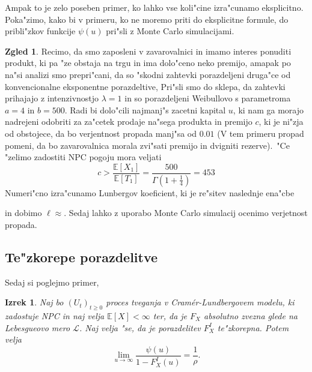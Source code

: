 \documentclass[12pt, a4paper, reqno]{amsart}
\theoremstyle{definition}
\newtheorem{zgled}[definicija]{Zgled}
\theoremstyle{plain}
\newtheorem{izrek}[definicija]{Izrek}
\newcommand{\E}{\mathbb{E}}
\newcommand{\1}{\mathds{1}}
\begin{document}
                Ampak to je zelo poseben primer, ko lahko vse koli"cine izra"cunamo eksplicitno.
                Poka"zimo, kako bi v primeru, ko ne moremo priti do eksplicitne formule,
                 do pribli"zkov funkcije $\psi(u)$ pri"sli z Monte Carlo simulacijami.
            
            \begin{zgled}
                Recimo, da smo zaposleni v zavarovalnici in imamo interes ponuditi produkt, ki 
                pa "ze obstaja na trgu in ima dolo"ceno neko premijo, amapak po na"si analizi smo 
                prepri"cani, da so "skodni
                zahtevki porazdeljeni druga"ce od konvencionalne eksponentne porazdeltive, Pri"sli smo 
                do sklepa, da zahtevki prihajajo z intenzivnostjo
                $\lambda = 1$ in so porazdeljeni Weibullovo s parametroma $a = 4$ in $b = 500$. 
                Radi bi dolo"cili najmanj"s zacetni kapital $u$, ki nam ga morajo nadrejeni
                odobriti za za"cetek prodaje 
                na"sega produkta in premijo $c$, ki je ni"zja od obstojece, da bo verjentnost 
                propada manj"sa od $0.01$ (V tem primeru propad pomeni, da bo zavarovalnica morala 
                zvi"sati premijo in dvigniti rezerve).\ "Ce "zelimo zadostiti NPC pogoju mora veljati 
                \begin{equation*}
                    c > \frac{\E\left[X_1\right]}{\E\left[T_1\right]} =  \frac{500}{\Gamma(1 + \tfrac{1}{4})} = 453
                \end{equation*} 
                Numeri"cno izra"cunamo Lunbergov koeficient, ki je re"sitev 
                naslednje ena"cbe
                
                in dobimo $\ell \approx .$
                Sedaj lahko z uporabo Monte Carlo simulacij ocenimo verjetnost propada.
                
            \end{zgled}


        
    \subsection{Te"zkorepe porazdelitve}
        Sedaj si poglejmo primer, 
        \begin{izrek}
            Naj bo $(U_t)_{t\geq0}$ proces tveganja v Cramér-Lundbergovem modelu, ki zadostuje NPC in naj 
            velja $\E\left[X\right]<\infty$ ter, da je $F_X$ absolutno zvezna glede na Lebesgueovo mero $\mathcal{L}$. Naj velja "se, da je porazdelitev $F_X^I$ te"zkorepna. Potem velja 
            \begin{equation}
                \lim_{u\to\infty}\frac{\psi(u)}{1 - F_X^I(u)} = \frac{1}{\rho}.
                \label{eq:tezkorepnePorazdelitveAsimptotika}
            \end{equation}
            \label{izr:tezkorepnePorazdelitveAsimptotika}
        \end{izrek}
\end{document}
